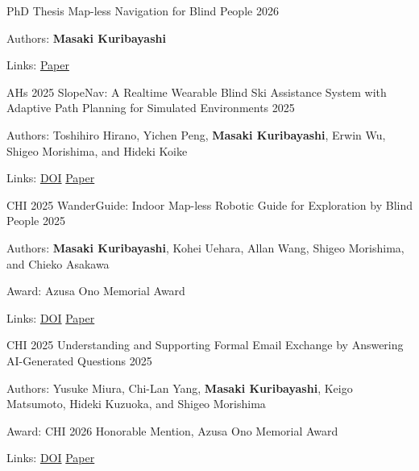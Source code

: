 \begin{cventries}
  \cventry
    {PhD Thesis}
    {Map-less Navigation for Blind People}
    {}
    {2026}
    {
      \begin{cvitems}
        \item {Authors: \textbf{Masaki Kuribayashi}}
        \item {Links: \href{https://chestnutforestlabo.github.io/website/data/project/masaki_kuribayashi_phd_thesis_2026/paper.pdf}{Paper}}
      \end{cvitems}
    }

  \cventry
    {AHs 2025}
    {SlopeNav: A Realtime Wearable Blind Ski Assistance System with Adaptive Path Planning for Simulated Environments}
    {}
    {2025}
    {
      \begin{cvitems}
        \item {Authors: Toshihiro Hirano, Yichen Peng, \textbf{Masaki Kuribayashi}, Erwin Wu, Shigeo Morishima, and Hideki Koike}
        \item {Links: \href{https://doi.org/10.1145/3745900.3746082}{DOI} \enskip\textbar\enskip \href{https://chestnutforestlabo.github.io/website/data/project/toshihiro_hirano_ahs_2025/paper.pdf}{Paper}}
      \end{cvitems}
    }

  \cventry
    {CHI 2025}
    {WanderGuide: Indoor Map-less Robotic Guide for Exploration by Blind People}
    {}
    {2025}
    {
      \begin{cvitems}
        \item {Authors: \textbf{Masaki Kuribayashi}, Kohei Uehara, Allan Wang, Shigeo Morishima, and Chieko Asakawa}
        \item {Award: Azusa Ono Memorial Award}
        \item {Links: \href{https://doi.org/10.1145/3706598.3713788}{DOI} \enskip\textbar\enskip \href{https://chestnutforestlabo.github.io/website/data/project/masaki_kuribayashi_chi_2025/paper.pdf}{Paper}}
      \end{cvitems}
    }

  \cventry
    {CHI 2025}
    {Understanding and Supporting Formal Email Exchange by Answering AI-Generated Questions}
    {}
    {2025}
    {
      \begin{cvitems}
        \item {Authors: Yusuke Miura, Chi-Lan Yang, \textbf{Masaki Kuribayashi}, Keigo Matsumoto, Hideki Kuzuoka, and Shigeo Morishima}
        \item {Award: CHI 2026 Honorable Mention, Azusa Ono Memorial Award}
        \item {Links: \href{https://doi.org/10.1145/3706598.3714016}{DOI} \enskip\textbar\enskip \href{https://chestnutforestlabo.github.io/website/data/project/yusuke_miura_chi_2025/paper.pdf}{Paper}}
      \end{cvitems}
    }


\end{cventries}
